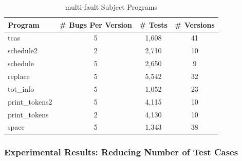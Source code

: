 \begin{table}[!htbp]
	\centering
	\caption{multi-fault Subject Programs}\label{tab:multibug}
	\renewcommand{\arraystretch}{1.5}
    \begin{tabular}{|l|c|c|c|} \hline
        Program & \# Bugs Per Version &\# Tests& \# Versions\\ \hline\hline
		tcas & 5 &1,608& 41\\ \hline
        schedule2 & 2& 2,710 & 10\\ \hline
        schedule & 5&2,650 & 9\\ \hline
        replace & 5&5,542 & 32\\ \hline
		tot\_info & 5 &1,052 & 23\\ \hline
        print\_tokens2 & 5 &4,115& 10\\ \hline
        print\_tokens & 2&4,130 & 10\\ \hline
        space & 5&1,343 & 38\\ \hline
	\end{tabular}
\end{table}




\subsubsection{Experimental Results: Reducing Number of Test Cases}\label{sec.exp.resultsA2}


